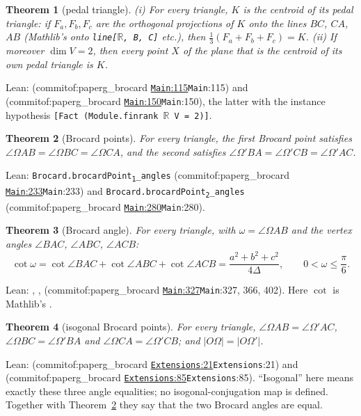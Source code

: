\documentclass[11pt]{article}
\newtheorem{theorem}{Theorem}
\theoremstyle{definition}
\theoremstyle{remark}
\newcommand{\lean}[1]{\texttt{#1}}
\newcommand{\commitof}[1]{\csname commitof:#1\endcsname}
\newcommand{\repo}[1]{https://github.com/jpbald93/#1}
\newcommand{\src}[4]{\ifcsname commitof:#1\endcsname
  \href{\repo{#1}/blob/\commitof{#1}/#2/#3.lean\#L#4}{\texttt{#3}:#4}\else\texttt{#3}:#4\fi}
\begin{document}
\begin{theorem}[pedal triangle]\label{thm:pedal}
(i) For every triangle, $K$ is the centroid of its pedal triangle: if $F_a,F_b,F_c$ are the
orthogonal projections of $K$ onto the lines $BC$, $CA$, $AB$ (Mathlib's
 onto \lean{line[\(\mathbb{R}\), B, C]} etc.), then
$\tfrac13(F_a+F_b+F_c)=K$.
(ii) If moreover $\dim V=2$, then every point $X$ of the plane that is the centroid of its own pedal
triangle is $K$.
\end{theorem}
Lean:  (\src{paperg_brocard}{Brocard}{Main}{115}) and
 (\src{paperg_brocard}{Brocard}{Main}{150}),
the latter with the instance hypothesis \lean{[Fact (Module.finrank \(\mathbb{R}\) V = 2)]}.

\begin{theorem}[Brocard points]\label{thm:brocard}
For every triangle, the first Brocard point satisfies
$\angle\Omega AB=\angle\Omega BC=\angle\Omega CA$, and the second satisfies
$\angle\Omega' BA=\angle\Omega' CB=\angle\Omega' AC$.
\end{theorem}
Lean: \texttt{Brocard.brocardPoint\textsubscript{1}\_angles} (\src{paperg_brocard}{Brocard}{Main}{233}) and
\texttt{Brocard.brocardPoint\textsubscript{2}\_angles} (\src{paperg_brocard}{Brocard}{Main}{280}).

\begin{theorem}[Brocard angle]\label{thm:cot}
For every triangle, with $\omega=\angle\Omega AB$ and the vertex angles $\angle BAC$, $\angle ABC$,
$\angle ACB$:
\[
\cot\omega=\cot\angle BAC+\cot\angle ABC+\cot\angle ACB=\frac{a^2+b^2+c^2}{4\Delta},
\qquad 0<\omega\le\frac\pi6.
\]
\end{theorem}
Lean: , ,
 (\src{paperg_brocard}{Brocard}{Main}{327}, 366, 402). Here
$\cot$ is Mathlib's .

\begin{theorem}[isogonal Brocard points]\label{thm:isogonal}
For every triangle, $\angle\Omega AB=\angle\Omega' AC$, $\angle\Omega BC=\angle\Omega' BA$ and
$\angle\Omega CA=\angle\Omega' CB$; and $|O\Omega|=|O\Omega'|$.
\end{theorem}
Lean:  (\src{paperg_brocard}{Brocard}{Extensions}{21}) and
 (\src{paperg_brocard}{Brocard}{Extensions}{85}).
``Isogonal'' here means exactly these three angle equalities; no isogonal-conjugation map is defined.
Together with Theorem~\ref{thm:brocard} they say that the two Brocard angles are equal.
\end{document}
